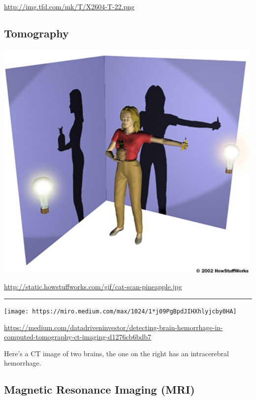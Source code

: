 \documentclass[]{article}
\begin{document}
\url{http://img.tfd.com/mk/T/X2604-T-22.png}

\hypertarget{tomography}{%
\subsection{Tomography}\label{tomography}}

\begin{center}\includegraphics[width=500px]{img/cat-scan-pineapple} \end{center}

\url{http://static.howstuffworks.com/gif/cat-scan-pineapple.jpg}

\begin{center}\rule{0.5\linewidth}{\linethickness}\end{center}

\begin{center}\texttt{[image: https://miro.medium.com/max/1024/1*j09PgBpdJIHXhlyjcby0HA]} \end{center}


\url{https://medium.com/datadriveninvestor/detecting-brain-hemorrhage-in-computed-tomography-ct-imaging-d1276cb6bdb7}

Here's a CT image of two brains, the one on the right has an
intracerebral hemorrhage.

\hypertarget{magnetic-resonance-imaging-mri}{%
\subsection{\texorpdfstring{\textbf{Magnetic Resonance Imaging
(MRI)}}{Magnetic Resonance Imaging (MRI)}}\label{magnetic-resonance-imaging-mri}}
\end{document}
